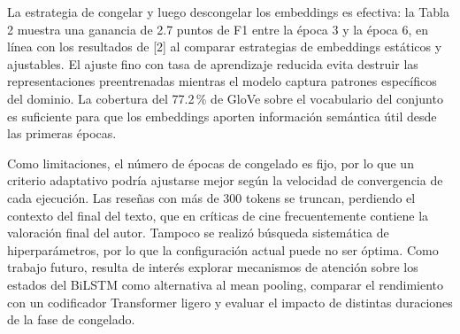 \documentclass[letterpaper, 10pt, conference]{ieeeconf}
\begin{document}
La estrategia de congelar y luego descongelar los embeddings es efectiva: la
Tabla 2 muestra una ganancia de 2.7 puntos de F1 entre la \'epoca 3 y la
\'epoca 6, en l\'inea con los resultados de [2] al comparar estrategias de
embeddings est\'aticos y ajustables. El ajuste fino con tasa de aprendizaje
reducida evita destruir las representaciones preentrenadas mientras el modelo
captura patrones espec\'ificos del dominio. La cobertura del 77.2\,\% de GloVe
sobre el vocabulario del conjunto es suficiente para que los embeddings aporten
informaci\'on sem\'antica \'util desde las primeras \'epocas.

Como limitaciones, el n\'umero de \'epocas de congelado es fijo, por lo que
un criterio adaptativo podr\'ia ajustarse mejor seg\'un la velocidad de
convergencia de cada ejecuci\'on. Las rese\~nas con m\'as de 300 tokens se
truncan, perdiendo el contexto del final del texto, que en cr\'iticas de cine
frecuentemente contiene la valoraci\'on final del autor. Tampoco se realiz\'o
b\'usqueda sistem\'atica de hiperpar\'ametros, por lo que la configuraci\'on
actual puede no ser \'optima. Como trabajo futuro, resulta de inter\'es
explorar mecanismos de atenci\'on sobre los estados del BiLSTM como alternativa
al mean pooling, comparar el rendimiento con un codificador Transformer ligero
y evaluar el impacto de distintas duraciones de la fase de congelado.

\clearpage
\end{document}
